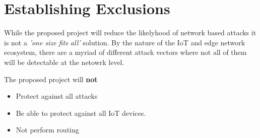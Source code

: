 \section{Establishing Exclusions}

While the proposed project will reduce the likelyhood of network based attacks it is not a \textit{'one size fits all'} solution. 
By the nature of the IoT and edge network ecosystem, there are a myriad of different attack vectors where not all of them will be detectable at the
netowrk level.

The proposed project will \textbf{not}
\begin{itemize}
    \item Protect against all attacks
    \item Be able to protect against all IoT devices.
    \item Not perform routing
\end{itemize}